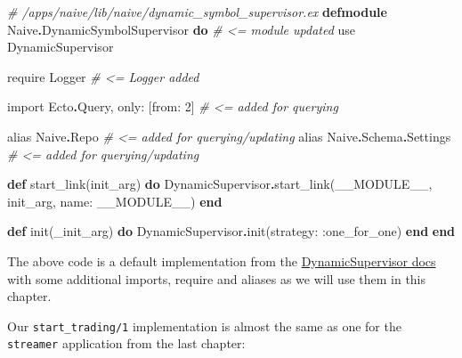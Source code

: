 \documentclass[
  oneside]{book}
\newenvironment{Shaded}{\begin{snugshade}}{\end{snugshade}}
\newcommand{\CommentTok}[1]{\textcolor[rgb]{0.56,0.35,0.01}{\textit{#1}}}
\newcommand{\ConstantTok}[1]{\textcolor[rgb]{0.00,0.00,0.00}{#1}}
\newcommand{\DecValTok}[1]{\textcolor[rgb]{0.00,0.00,0.81}{#1}}
\newcommand{\ImportTok}[1]{#1}
\newcommand{\KeywordTok}[1]{\textcolor[rgb]{0.13,0.29,0.53}{\textbf{#1}}}
\newcommand{\NormalTok}[1]{#1}
\newcommand{\OperatorTok}[1]{\textcolor[rgb]{0.81,0.36,0.00}{\textbf{#1}}}
\newcommand{\VariableTok}[1]{\textcolor[rgb]{0.00,0.00,0.00}{#1}}
\begin{document}
\begin{Shaded}
\begin{Highlighting}[]
\CommentTok{\# /apps/naive/lib/naive/dynamic\_symbol\_supervisor.ex}
\KeywordTok{defmodule} \ConstantTok{Naive}\OperatorTok{.}\ConstantTok{DynamicSymbolSupervisor} \KeywordTok{do} \CommentTok{\# \textless{}= module updated}
  \ImportTok{use} \ConstantTok{DynamicSupervisor}

  \ImportTok{require} \ConstantTok{Logger} \CommentTok{\# \textless{}= Logger added}

  \ImportTok{import} \ConstantTok{Ecto}\OperatorTok{.}\ConstantTok{Query}\NormalTok{, }\VariableTok{only:}\NormalTok{ [}\VariableTok{from:} \DecValTok{2}\NormalTok{] }\CommentTok{\# \textless{}= added for querying}

  \ImportTok{alias} \ConstantTok{Naive}\OperatorTok{.}\ConstantTok{Repo}             \CommentTok{\# \textless{}= added for querying/updating}
  \ImportTok{alias} \ConstantTok{Naive}\OperatorTok{.}\ConstantTok{Schema}\OperatorTok{.}\ConstantTok{Settings}  \CommentTok{\# \textless{}= added for querying/updating}

  \KeywordTok{def}\NormalTok{ start\_link(init\_arg) }\KeywordTok{do}
    \ConstantTok{DynamicSupervisor}\OperatorTok{.}\NormalTok{start\_link(}\ConstantTok{\_\_MODULE\_\_}\NormalTok{, init\_arg, }\VariableTok{name:} \ConstantTok{\_\_MODULE\_\_}\NormalTok{)}
  \KeywordTok{end}

  \KeywordTok{def}\NormalTok{ init(\_init\_arg) }\KeywordTok{do}
    \ConstantTok{DynamicSupervisor}\OperatorTok{.}\NormalTok{init(}\VariableTok{strategy:} \VariableTok{:one\_for\_one}\NormalTok{)}
  \KeywordTok{end}
\KeywordTok{end}
\end{Highlighting}
\end{Shaded}

The above code is a default implementation from the \href{https://hexdocs.pm/elixir/master/DynamicSupervisor.html\#module-module-based-supervisors}{DynamicSupervisor docs} with some additional imports, require and aliases as we will use them in this chapter.

Our \texttt{start\_trading/1} implementation is almost the same as one for the \texttt{streamer} application from the last chapter:
\end{document}
